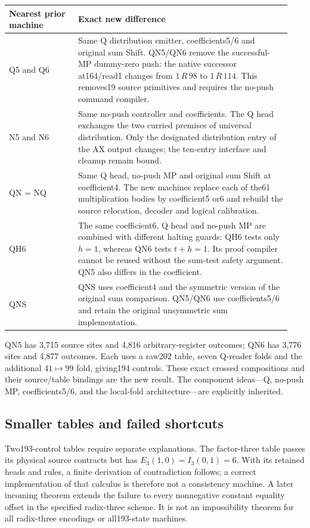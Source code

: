 \begin{longtable}{@{}p{0.23\linewidth}p{0.71\linewidth}@{}}
\toprule
Nearest prior machine & Exact new difference\\
\midrule\endhead
Q5 and Q6 &
Same Q distribution emitter, coefficients5/6 and original sum Shift. QN5/QN6
remove the successful-MP dummy-zero push: the native successor at164/read1
changes from $1\,R\,98$ to $1\,R\,114$. This removes19 source primitives and
requires the no-push command compiler.\\[3pt]
N5 and N6 &
Same no-push controller and coefficients. The Q head exchanges the two curried
premises of universal distribution. Only the designated distribution entry
of the AX output changes; the ten-entry interface and cleanup remain bound.\\[3pt]
QN = NQ &
Same Q head, no-push MP and original sum Shift at coefficient4. The new
machines replace each of the61 multiplication bodies by coefficient5 or6
and rebuild the source relocation, decoder and logical calibration.\\[3pt]
QH6 &
The same coefficient6, Q head and no-push MP are combined with different
halting guards: QH6 tests only $h=1$, whereas QN6 tests $t+h=1$. Its proof
compiler cannot be reused without the sum-test safety argument. QN5 also
differs in the coefficient.\\[3pt]
QNS &
QNS uses coefficient4 and the symmetric version of the original sum
comparison. QN5/QN6 use coefficients5/6 and retain the original unsymmetric
sum implementation.\\
\bottomrule
\end{longtable}

QN5 has 3,715 source sites and 4,816 arbitrary-register outcomes; QN6 has
3,776 sites and 4,877 outcomes. Each uses a raw202 table, seven Q-reader folds
and the additional $41\mapsto99$ fold, giving194 controls. These exact crossed
compositions and their source/table bindings are the new result. The component
ideas---Q, no-push MP, coefficients5/6, and the local-fold architecture---are
explicitly inherited.

\subsection{Smaller tables and failed shortcuts}

Two193-control tables require separate explanations. The factor-three table
passes its physical source contracts but has
$E_3(1,0)=I_3(0,1)=6$. With its retained heads and rules, a finite derivation
of contradiction follows; a correct implementation of that calculus is
therefore not a consistency machine. A later incoming theorem extends the
failure to every nonnegative constant equality offset in the specified
radix-three scheme. It is not an impossibility theorem for all radix-three
encodings or all193-state machines.

